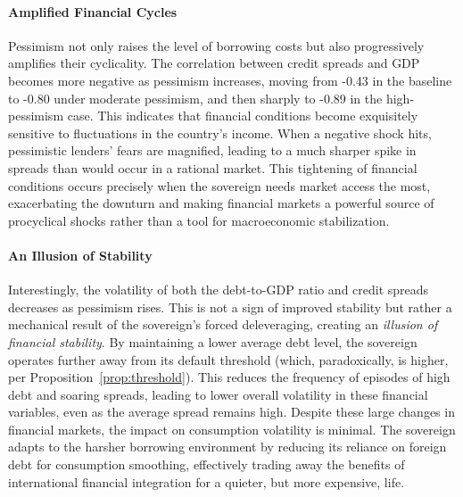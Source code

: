 \documentclass[12pt]{article}
\theoremstyle{plain}
\begin{document}
\paragraph{Amplified Financial Cycles}
Pessimism not only raises the level of borrowing costs but also progressively
amplifies their cyclicality. The correlation between credit spreads and GDP
becomes more negative as pessimism increases, moving from -0.43 in the baseline
to -0.80 under moderate pessimism, and then sharply to -0.89 in the
high-pessimism case. This indicates that financial conditions become
exquisitely sensitive to fluctuations in the country's income. When a negative
shock hits, pessimistic lenders' fears are magnified, leading to a much sharper
spike in spreads than would occur in a rational market. This tightening of
financial conditions occurs precisely when the sovereign needs market access
the most, exacerbating the downturn and making financial markets a powerful
source of procyclical shocks rather than a tool for macroeconomic
stabilization.

\paragraph{An Illusion of Stability}
Interestingly, the volatility of both the debt-to-GDP ratio and credit spreads
decreases as pessimism rises. This is not a sign of improved stability but
rather a mechanical result of the sovereign's forced deleveraging, creating an
\textit{illusion of financial stability}. By maintaining a lower average debt
level, the sovereign operates further away from its default threshold (which,
paradoxically, is higher, per Proposition~\ref{prop:threshold}). This reduces
the frequency of episodes of high debt and soaring spreads, leading to lower
overall volatility in these financial variables, even as the average spread
remains high. Despite these large changes in financial markets, the impact on
consumption volatility is minimal. The sovereign adapts to the harsher
borrowing environment by reducing its reliance on foreign debt for consumption
smoothing, effectively trading away the benefits of international financial
integration for a quieter, but more expensive, life.
\end{document}
